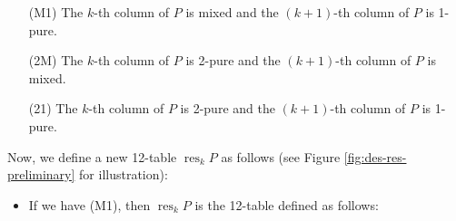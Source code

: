 \documentclass[numbers=enddot,12pt,final,onecolumn,notitlepage]{scrartcl}%
\theoremstyle{definition}
\begin{document}
\begin{itemize}
\item[(M1)] The $k$-th column of $P$ is mixed and the $\left(  k+1\right)  $-th column of $P$ is 1-pure.

\item[(2M)] The $k$-th column of $P$ is 2-pure and the $\left(  k+1\right)  $-th column of $P$ is mixed.

\item[(21)] The $k$-th column of $P$ is 2-pure and the $\left(  k+1\right)  $-th column of $P$ is 1-pure.
\end{itemize}

Now, we define a new 12-table $\operatorname*{res}\nolimits_{k}P$ as follows (see Figure \ref{fig:des-res-preliminary} for illustration):

\begin{itemize}
\item If we have (M1), then $\operatorname*{res}_{k}P$ is the
12-table defined as follows:

\end{itemize}
\end{document}

